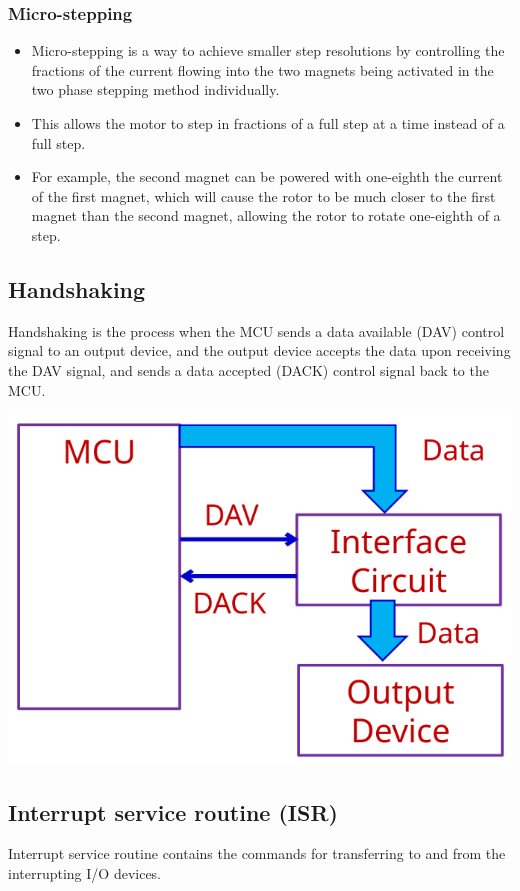 \documentclass[11pt]{article}
\begin{document}
 \newpage
\subsubsection{Micro-stepping}
\label{sec:orga4544a1}
\begin{itemize}
\item Micro-stepping is a way to achieve smaller step resolutions by controlling the fractions of the current flowing into the two magnets being activated in the two phase stepping method individually.
\item This allows the motor to step in fractions of a full step at a time instead of a full step.
\item For example, the second magnet can be powered with one-eighth the current of the first magnet, which will cause the rotor to be much closer to the first magnet than the second magnet, allowing the rotor to rotate one-eighth of a step.
\end{itemize}
\subsection{Handshaking}
\label{sec:orga45f4ca}
Handshaking is the process when the MCU sends a data available (DAV) control signal to an output device, and the output device accepts the data upon receiving the DAV signal, and sends a data accepted (DACK) control signal back to the MCU.

\begin{center}
\includegraphics[scale=1]{./images/handshaking-diagram.png}
\end{center}
\subsection{Interrupt service routine (ISR)}
\label{sec:org8f69401}
Interrupt service routine contains the commands for transferring to and from the interrupting I/O devices.
\end{document}
